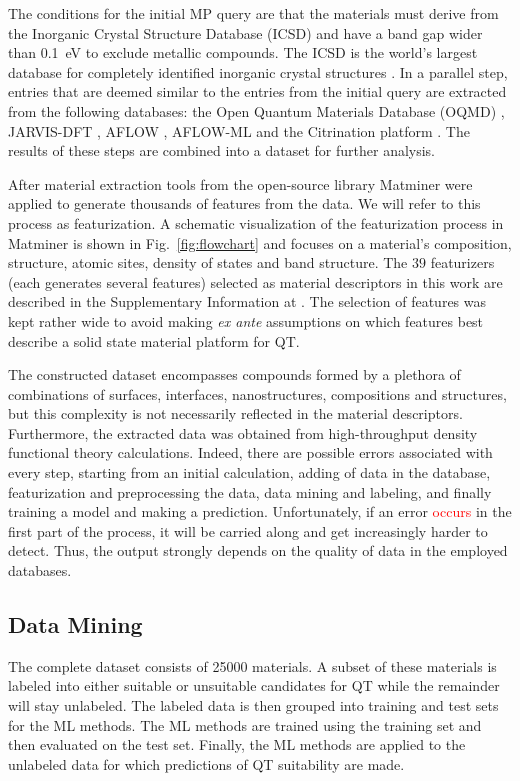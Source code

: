 \documentclass[superscriptaddress,
preprint,
 amsmath,amssymb,
 aps,
]{revtex4-2}
\newcommand{\mrk}[1]{\textcolor{red}{#1}}
\begin{document}
The conditions for the initial MP query are that the materials must derive from the Inorganic Crystal Structure Database (ICSD) and have a band gap wider than \SI{0.1}{\electronvolt} to exclude metallic compounds.
The ICSD is the world's largest database for completely identified inorganic crystal structures  \cite{Allen1987,Zagorac2019}. In a parallel step, entries that are deemed similar to the entries from the initial query are extracted from the following databases: the Open Quantum Materials Database (OQMD) \cite{Saal2013,Kirklin2015}, JARVIS-DFT \cite{Choudhary2020}, AFLOW \cite{Curtarolo2012, Curtarolo2012a, Calderon2015}, AFLOW-ML \cite{Isayev2017} and the Citrination platform \cite{OMaraJordan2016MDIA}. The results of these steps are combined into a dataset for further analysis. 

After material extraction tools from the open-source library Matminer \cite{Ward2018} were applied to generate thousands of features from the data. We will refer to this process as featurization. A schematic visualization of the featurization process in Matminer is shown in  Fig.~\ref{fig:flowchart} 
and focuses on a material's composition,  structure, atomic sites, density of states and band structure. 
The $39$ featurizers (each generates several features) selected as material descriptors in this work are described in the Supplementary Information at \cite{supplementary}. The selection of features was kept rather wide to avoid making {\em ex ante} assumptions on which features best describe a solid state material platform for QT. 

The constructed dataset encompasses compounds formed by a plethora of combinations of surfaces, interfaces, nanostructures, compositions and structures, but this complexity is not necessarily reflected in the material descriptors. 
Furthermore, the extracted data was obtained from high-throughput density functional theory calculations. Indeed, there are possible errors associated with every step, starting from an initial calculation, adding of data in the database, featurization and preprocessing the data, data mining and labeling, and finally training a model and making a prediction.  Unfortunately, if an error \mrk{occurs} in the first part of the process, it will be  carried along and get increasingly harder to detect. Thus, the output strongly depends on the quality of data in the employed databases. 

\subsection*{Data Mining}
The complete dataset consists of \num{25000} materials. A subset of these materials is labeled into either suitable or unsuitable candidates for QT while the remainder will stay unlabeled. The labeled data is then grouped into training and test sets for the ML methods. The ML methods are trained using the training set and then evaluated on the test set. Finally, the ML methods are applied to the unlabeled data for which predictions of QT suitability are made.
\end{document}
